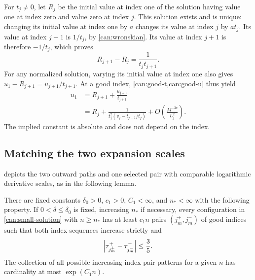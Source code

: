 For $t_j\ne0$, let $R_j$ be the initial value at index one of the
solution having value one at index zero and value zero at index $j$.
This solution exists and is unique: changing its initial value at index
one by $a$ changes its value at index $j$ by $at_j$.  Its value at
index $j-1$ is $1/t_j$, by \cref{can:wronskian}. Its value at index
$j+1$ is therefore $-1/t_j$, which proves
\[
R_{j+1}-R_j=\frac1{t_jt_{j+1}}.
\]
For any normalized solution, varying its initial value at index one also
gives $u_1-R_{j+1}=u_{j+1}/t_{j+1}$.  At a good index,
\cref{can:good-t,can:good-u} thus yield
\begin{equation}\label{can:boundary-expansion}
\begin{aligned}
u_1
&=R_{j+1}+\frac{u_{j+1}}{t_{j+1}}\\
&=R_j+\frac1{t_j^2(v_j-t_{j-1}/t_j)}
  +O\left(\frac{M^{-3c}}{L_j^2}\right).
\end{aligned}
\end{equation}
The implied constant is absolute and does not depend on the index.

\subsection{Matching the two expansion scales}

 depicts the two outward paths and one selected
pair with comparable logarithmic derivative scales, as in the following lemma.

\begin{lemma}\label{can:matching}
There are fixed constants $\delta_0>0$, $c_1>0$, $C_1<\infty$, and
$n_*<\infty$ with the following property.  If $0<\delta\le\delta_0$
is fixed, increasing $n_*$ if necessary, every configuration in
\cref{can:small-solution} with $n\ge n_*$ has at least $c_1n$ pairs
$(j_m^+,j_m^-)$ of good indices such that both index sequences increase
strictly and
\begin{equation}\label{can:matching-condition}
\left\lvert\tau_{j_m^+}^+-\tau_{j_m^-}^-\right\rvert\le\frac35.
\end{equation}
The collection of all possible increasing index-pair patterns for a
given $n$ has cardinality at most $\exp(C_1n)$.
\end{lemma}

